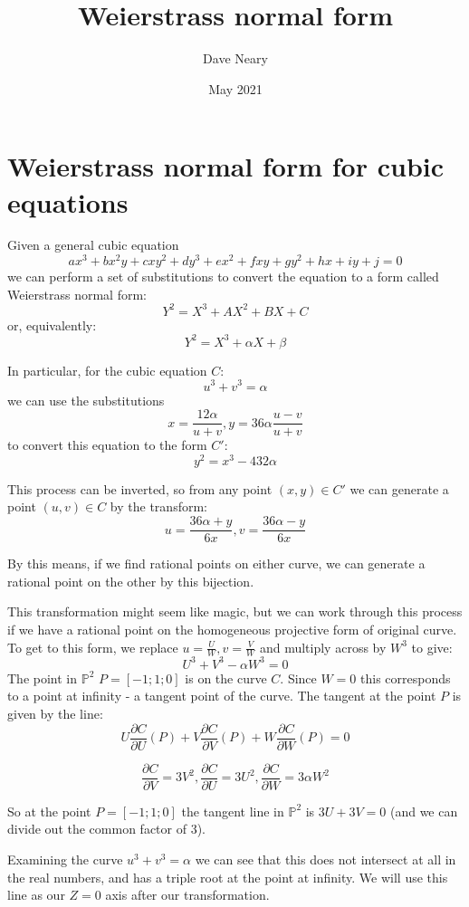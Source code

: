 \documentclass{article}
\title{Weierstrass normal form}
\author{Dave Neary}
\date{May 2021}
\begin{document}
\maketitle

\section{Weierstrass normal form for cubic equations}

Given a general cubic equation
\[ ax^3 +bx^2y +cxy^2 + dy^3 +ex^2 + fxy +gy^2 + hx + iy +j = 0 \]
we can perform a set of substitutions to convert the equation to a form called Weierstrass normal form:
\[ Y^2 = X^3 + AX^2 + BX + C \]
or, equivalently:
\[ Y^2 = X^3 + \alpha X + \beta \]

In particular, for the cubic equation $C$:
\[u^3+v^3=\alpha \]
we can use the substitutions
\[x = \frac{12\alpha}{u+v}, y = 36\alpha\frac{u-v}{u+v} \]
to convert this equation to the form $C'$:
\[ y^2 = x^3 - 432 \alpha \]

This process can be inverted, so from any point $(x,y) \in C'$ we can generate a point $(u,v) \in C$ by the transform:
\[u = \frac{36\alpha +y}{6x}, v = \frac{36\alpha - y}{6x} \]

By this means, if we find rational points on either curve, we can generate a rational point on the other by this bijection.

This transformation might seem like magic, but we can work through this process if we have a rational point on the homogeneous projective form of original curve. To get to this form, we replace $u = \frac{U}{W}, v = \frac{V}{W}$ and multiply across by $W^3$ to give:
\[ U^3 + V^3 - \alpha W^3 = 0 \]
The point in $\mathbb{P}^2$ $P = [-1; 1; 0]$ is on the curve $C$. Since $W=0$ this corresponds to a point at infinity - a tangent point of the curve. The tangent at the point $P$ is given by the line:
\[ U \frac{\partial C}{\partial U} (P) + V \frac{\partial C}{\partial V} (P) + W \frac{\partial C}{\partial W} (P) = 0 \]

\[ \frac{\partial C}{\partial V} = 3V^2, \frac{\partial C}{\partial U} = 3U^2, \frac{\partial C}{\partial W} = 3\alpha W^2 \]

So at the point $P = [-1;1;0]$ the tangent line in $\mathbb{P}^2$ is $3U + 3V = 0$ (and we can divide out the common factor of 3).

Examining the curve $u^3+v^3=\alpha$ we can see that this does not intersect at all in the
real numbers, and has a triple root at the point at infinity. We will use this line as our
$Z=0$ axis after our transformation.
\end{document}
